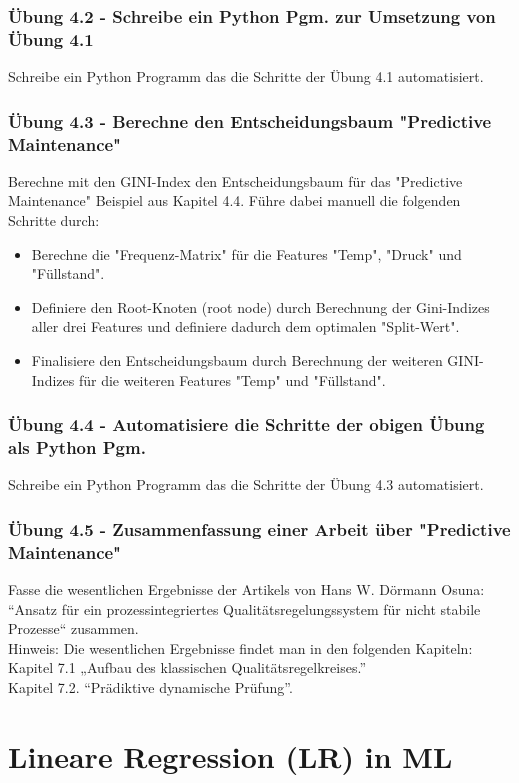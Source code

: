 \documentclass[12pt]{article}
\begin{document}
\subsubsection{Übung 4.2 - Schreibe ein Python Pgm. zur Umsetzung von Übung 4.1}
Schreibe ein Python Programm das die Schritte der Übung 4.1 automatisiert.\\
%
\subsubsection{Übung 4.3 - Berechne den Entscheidungsbaum "Predictive Maintenance"}
Berechne mit den GINI-Index den Entscheidungsbaum für das "Predictive Maintenance" Beispiel aus Kapitel 4.4. Führe dabei manuell die folgenden Schritte durch:\\
\begin{itemize}
    \item Berechne die "Frequenz-Matrix" für die Features "Temp", "Druck" und "Füllstand".  
    \item Definiere den Root-Knoten (root node) durch Berechnung der Gini-Indizes aller drei Features und definiere dadurch dem optimalen "Split-Wert".
    \item Finalisiere den Entscheidungsbaum durch Berechnung der weiteren GINI-Indizes für die weiteren Features "Temp" und "Füllstand".
\end{itemize}
%
\subsubsection{Übung 4.4 - Automatisiere die Schritte der obigen Übung als Python Pgm.}
Schreibe ein Python Programm das die Schritte der Übung 4.3 automatisiert.\\\subsubsection{Übung 4.5 - Zusammenfassung einer Arbeit über "Predictive Maintenance"}
Fasse die wesentlichen Ergebnisse der Artikels von Hans W. Dörmann Osuna: “Ansatz für ein prozessintegriertes Qualitätsregelungssystem für nicht stabile Prozesse“ zusammen.\\ 
Hinweis: Die wesentlichen Ergebnisse findet man in den folgenden Kapiteln:\\
Kapitel 7.1 „Aufbau des klassischen Qualitätsregelkreises.”\\
Kapitel 7.2. “Prädiktive dynamische Prüfung”.
%
\newpage

\section{Lineare Regression (LR) in ML \\}
\end{document}
